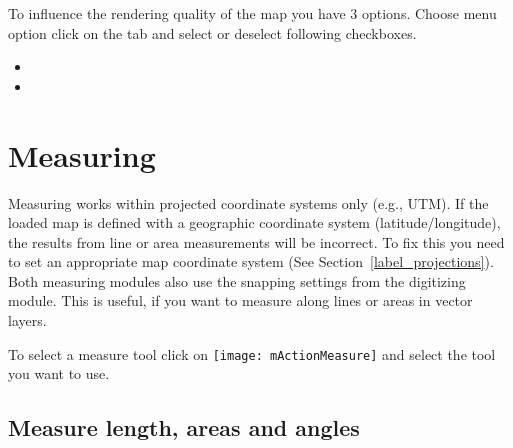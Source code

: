 \label{label_renderquality}

To influence the rendering quality of the map you have 3 options. Choose menu
option  \arrow {} click on the
 tab and select or deselect following checkboxes.

\begin{itemize}
\item {}
\item {}
\end{itemize}

\section{Measuring}\label{sec:measure}

Measuring works within projected coordinate systems only (e.g., UTM). If
the loaded map is defined with a geographic coordinate system
(latitude/longitude), the results from line or area measurements will be
incorrect. To fix this you need to set an appropriate map coordinate system
(See Section~\ref{label_projections}). Both measuring modules also use the
snapping settings from the digitizing module. This is useful, if you want to
measure along lines or areas in vector layers.

To select a measure tool click on \texttt{[image: mActionMeasure]} and 
select the tool you want to use.

\subsection{Measure length, areas and angles}

